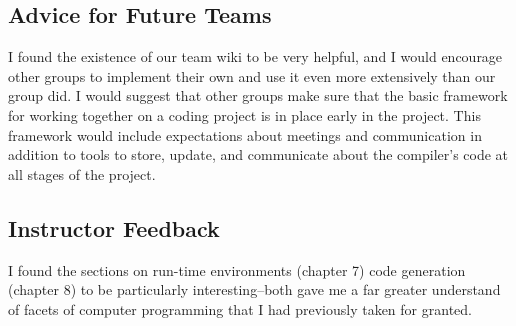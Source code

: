 \subsection{Advice for Future Teams}
I found the existence of our team wiki to be very helpful, and I would
encourage other groups to implement their own and use it even more
extensively than our group did. I would suggest that other groups make
sure that the basic framework for working together on a coding project
is in place early in the project. This framework would include
expectations about meetings and communication in addition to tools to
store, update, and communicate about the compiler’s code at all stages
of the project.

\subsection{Instructor Feedback}
I found the sections on run-time environments (chapter 7) code
generation (chapter 8) to be particularly interesting--both gave me a
far greater understand of facets of computer programming that I had
previously taken for granted.
